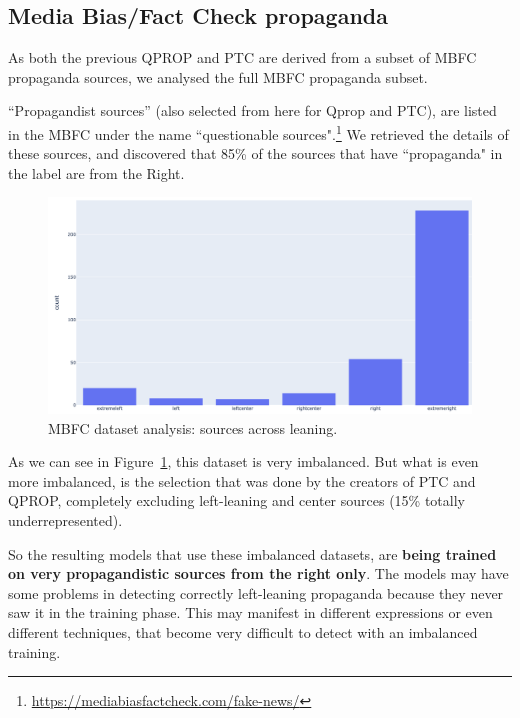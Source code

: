 \subsection{Media Bias/Fact Check propaganda}
As both the previous QPROP and PTC are derived from a subset of MBFC propaganda sources, we analysed the full MBFC propaganda subset.

“Propagandist sources” (also selected from here for Qprop and PTC), are listed in the MBFC under the name ``questionable sources".\footnote{\url{https://mediabiasfactcheck.com/fake-news/}}
We retrieved the details of these sources, and discovered that 85\% of the sources that have ``propaganda" in the label are from the Right.

\begin{figure}[!htbp]
   \centering
   \includegraphics[width=\linewidth]{figures/leaning_questionable.png}
   \caption{MBFC dataset analysis: sources across leaning.}
   \label{fig:mbfc_across_leaning}
\end{figure}

As we can see in Figure~\ref{fig:mbfc_across_leaning}, this dataset is very imbalanced. But what is even more imbalanced, is the selection that was done by the creators of PTC and QPROP, completely excluding left-leaning and center sources (15\% totally underrepresented).

So the resulting models that use these imbalanced datasets, are \textbf{being trained on very propagandistic sources from the right only}. The models may have some problems in detecting correctly left-leaning propaganda because they never saw it in the training phase. This may manifest in different expressions or even different techniques, that become very difficult to detect with an imbalanced training. 

